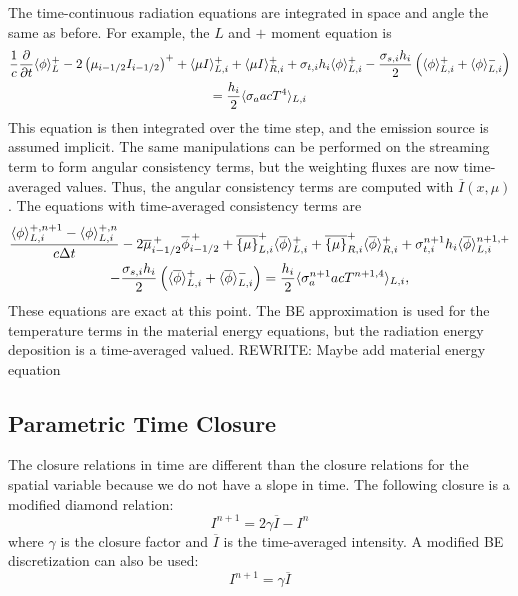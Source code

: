 The time-continuous radiation equations are integrated in space and angle the same as
before.  For example, the $L$ and $+$ moment equation is
\begin{multline}
    \frac{1}{c}   \frac{\partial  }{\partial t} \langle \phi \rangle^+_L - 2\left({\mu}_{i-1/2} I_{i-1/2}\right)^+ + \langle \mu I \rangle^+_{L,i} 
    + \langle \mu I \rangle^+_{R,i} +  \sigma_{t,i} h_i \langle \phi \rangle_{L,i}^{+} -  \frac{\sigma_{s,i} h_i}{2} \left( \langle \phi \rangle_{L,i}^{+} +
  \langle \phi \rangle_{L,i}^{-}\right) \\ = \frac{h_i}{2} \langle \sigma_a a c T^4 \rangle_{L,i} 
\end{multline}
This equation is then integrated over the time step, and the emission source is assumed
implicit.  The same manipulations can be
performed on the streaming term to form angular consistency terms, but the weighting fluxes are now
time-averaged values.  Thus, the angular consistency terms are computed with $\overline I(x,\mu)$.  
The equations with time-averaged consistency terms are
\begin{multline}\label{eq:t_moml_ex}
    \frac{\langle \phi \rangle_{L,i}^{+,n+1} - \langle \phi \rangle_{L,i}^{+,n}}{c \Delta t}
    -2\overline {\mu}_{i-1/2}^{\,+} \overline \phi_{i-1/2}^{\,+} + \overline{\left\{ \mu \right\}}_{L,i}^{+}
  \langle \overline{\phi} \rangle_{L,i}^{+}
  +  \overline{\left\{ \mu \right\}}_{R,i}^{+}
  \langle \overline{\phi} \rangle_{R,i}^{+} +  \sigma_{t,i}^{n+1} h_i 
  \langle \overline\phi \rangle_{L,i}^{n+1,+} \\-  \frac{\sigma_{s,i} h_i}{2} \left( \langle \overline{\phi} \rangle_{L,i}^{+} +
  \langle \overline{\phi} \rangle_{L,i}^{-}\right) = \frac{h_i}{2} \langle \sigma_a^{n+1} a c T^{n+1,4} \rangle_{L,i},
\end{multline}
These equations are exact at this point.  The BE approximation is used for the temperature
terms in the material energy equations, but the radiation energy deposition is a
time-averaged valued.
REWRITE: Maybe add material energy equation

\subsection{Parametric Time Closure}
%
The closure relations in time are different than the closure relations for the spatial
variable because we do not have a slope in time.  The following closure is a modified diamond
relation:
\begin{equation}\label{eq:tc_diam}
    I^{n+1} = 2\gamma \overline{I} - I^{n}
\end{equation}
where $\gamma$ is the closure factor and $\overline{I}$ is the time-averaged
intensity.  A modified BE discretization can also be used:
\begin{equation}\label{eq:tc_avg}
    I^{n+1} = \gamma \overline{I}
\end{equation}


